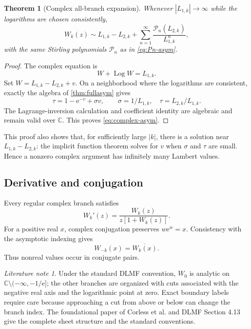 \documentclass[11pt]{article}
\newtheorem{theorem}{Theorem}[section]
\theoremstyle{remark}
\newtheorem{literaturenote}[literaturenote]{Literature note}
\newcommand{\ee}{\mathrm e}
\newcommand{\Log}{\operatorname{Log}}
\newcommand{\abs}[1]{\left|#1\right|}
\begin{document}
\begin{theorem}[Complex all-branch expansion]\label{thm:complex-asym}
Whenever \(\abs{L_{1,k}}\to\infty\) while the logarithms are chosen
consistently,
\begin{equation}\label{eq:complex-asym}
 W_k(z)\sim L_{1,k}-L_{2,k}
 +\sum_{n=1}^{\infty}
 \frac{\mathcal P_n(L_{2,k})}{L_{1,k}^n},
\end{equation}
with the same Stirling polynomials \(\mathcal P_n\) as in
\eqref{eq:Pn-asym}.
\end{theorem}

\begin{proof}
The complex equation is
\[
       W+\Log W=L_{1,k}.
\]
Set \(W=L_{1,k}-L_{2,k}+v\).  On a neighborhood where the logarithms are
consistent, exactly the algebra of \cref{thm:fullasym} gives
\[
       \tau=1-\ee^{-v}+\sigma v,\qquad
       \sigma=1/L_{1,k},\quad \tau=L_{2,k}/L_{1,k}.
\]
The Lagrange-inversion calculation and coefficient identity are algebraic
and remain valid over \(\mathbb C\).  This proves
\eqref{eq:complex-asym}.
\end{proof}

This proof also shows that, for sufficiently large \(\abs{k}\), there is a
solution near \(L_{1,k}-L_{2,k}\): the implicit function theorem solves for
\(v\) when \(\sigma\) and \(\tau\) are small.  Hence a nonzero complex
argument has infinitely many Lambert values.

\subsection{Derivative and conjugation}

Every regular complex branch satisfies
\[
       W_k'(z)=\frac{W_k(z)}{z[1+W_k(z)]}.
\]
For a positive real \(x\), complex conjugation preserves
\(w\ee^w=x\).  Consistency with the asymptotic indexing gives
\[
       W_{-k}(x)=\overline{W_k(x)}.
\]
Thus nonreal values occur in conjugate pairs.

\begin{literaturenote}
Under the standard DLMF convention, \(W_0\) is analytic on
\(\mathbb C\setminus(-\infty,-1/\ee]\); the other branches are organized
with cuts associated with the negative real axis and the logarithmic point
at zero.  Exact boundary labels require care because approaching a cut from
above or below can change the branch index.  The foundational paper of
Corless et al. and DLMF Section 4.13 give the complete sheet structure and
the standard conventions.
\end{literaturenote}
\end{document}
